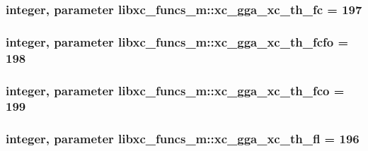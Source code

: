 \hypertarget{classlibxc__funcs__m_ab2a4479b768f91a95decd4dcce60ce92}{
\subsubsection[{xc\-\_\-gga\-\_\-xc\-\_\-th\-\_\-fc}]{\setlength{\rightskip}{0pt plus 5cm}integer, parameter libxc\-\_\-funcs\-\_\-m\-::xc\-\_\-gga\-\_\-xc\-\_\-th\-\_\-fc = 197}}\label{classlibxc__funcs__m_ab2a4479b768f91a95decd4dcce60ce92}
\hypertarget{classlibxc__funcs__m_a4c1444d5f088b32488ec4f04a0a6467d}{
\subsubsection[{xc\-\_\-gga\-\_\-xc\-\_\-th\-\_\-fcfo}]{\setlength{\rightskip}{0pt plus 5cm}integer, parameter libxc\-\_\-funcs\-\_\-m\-::xc\-\_\-gga\-\_\-xc\-\_\-th\-\_\-fcfo = 198}}\label{classlibxc__funcs__m_a4c1444d5f088b32488ec4f04a0a6467d}
\hypertarget{classlibxc__funcs__m_a118c61bedf0f29ea879522d3cd301032}{
\subsubsection[{xc\-\_\-gga\-\_\-xc\-\_\-th\-\_\-fco}]{\setlength{\rightskip}{0pt plus 5cm}integer, parameter libxc\-\_\-funcs\-\_\-m\-::xc\-\_\-gga\-\_\-xc\-\_\-th\-\_\-fco = 199}}\label{classlibxc__funcs__m_a118c61bedf0f29ea879522d3cd301032}
\hypertarget{classlibxc__funcs__m_aa04dcc0460f7a3a43e0a29bdec59524f}{
\subsubsection[{xc\-\_\-gga\-\_\-xc\-\_\-th\-\_\-fl}]{\setlength{\rightskip}{0pt plus 5cm}integer, parameter libxc\-\_\-funcs\-\_\-m\-::xc\-\_\-gga\-\_\-xc\-\_\-th\-\_\-fl = 196}}\label{classlibxc__funcs__m_aa04dcc0460f7a3a43e0a29bdec59524f}
